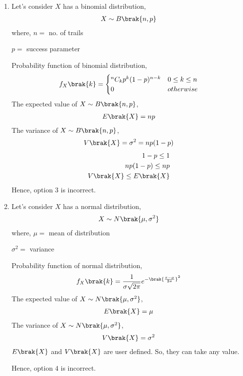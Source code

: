 \begin{enumerate}
    \item Let's consider $X$ has a binomial distribution,
    \begin{align}
        X \sim B\brak{n,p}
    \end{align}
    where,
    $n=$ no. of trails
    
    $p=$ success parameter
    
    Probability function of binomial distribution,
    \begin{align}
        f_X\brak{k}=
        \begin{cases}
            {^n C_k}p^k(1-p)^{n-k} & 0\leq k\leq n\\
            0 & otherwise
        \end{cases}
    \end{align}
    The expected value of $X \sim B\brak{n,p}$,
    \begin{align}
        E\brak{X}=np
    \end{align}
    The variance of $X \sim B\brak{n,p}$,
    \begin{align}
        V\brak{X}=\sigma^2=n p(1-p)
    \end{align}
    \begin{align}
        1-p\leq1\\
        n p(1-p)\leq n p\\
        V\brak{X}\leq E\brak{X}
    \end{align}
    Hence, option $3$ is incorrect.
    
    \item Let's consider $X$ has a normal distribution,
    \begin{align}
        X \sim N\brak{\mu,\sigma^2}
    \end{align}
    where,
    $\mu=$ mean of distribution
    
    $\sigma^2=$ variance
    
    Probability function of normal distribution,
    \begin{align}
        f_X\brak{k}=\frac{1}{\sigma\sqrt{2\pi}}e^{-\brak{\frac{x-\mu}{2\sigma}}^2}
    \end{align}
    The expected value of $X \sim N\brak{\mu,\sigma^2}$,
    \begin{align}
        E\brak{X}=\mu
    \end{align}
    The variance of $X \sim N\brak{\mu,\sigma^2}$,
    \begin{align}
        V\brak{X}=\sigma^2
    \end{align}
    $E\brak{X}$ and $V\brak{X}$ are user defined. So, they can take any value.
    
    Hence, option $4$ is incorrect.
    \end{enumerate}
    